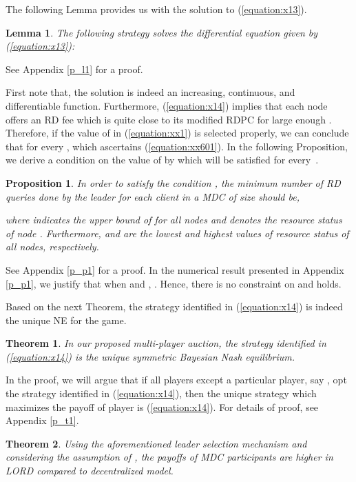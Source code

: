 \documentclass[journal,12pt, onecolumn]{IEEEtran}
\newtheorem{pr}{Proposition}
\newtheorem{lemma}{Lemma}
\newtheorem{thm}{Theorem}
\begin{document}
The following Lemma provides us with the solution to (\ref{equation:x13}).
\begin{lemma}\label{lemma:diff}
The following strategy solves the differential equation given by (\ref{equation:x13}):
\vspace{-2mm}
 
 
\end{lemma}
See Appendix \ref{p_l1} for a proof.

First note that, the solution  is indeed an increasing, continuous, and differentiable function. Furthermore, (\ref{equation:x14}) implies that each node offers an RD fee which is quite close to its modified RDPC for large enough . Therefore, if the value of  in (\ref{equation:xx1}) is selected properly, we can conclude that for every ,  which ascertains (\ref{equation:xx601}). In the following Proposition, we derive a condition on the value of  by which  will be satisfied for every~.

\begin{pr}\label{peoposition:etha}
In order to satisfy the condition , the minimum number of RD queries done by the leader for each client in a MDC of size  should be,

where  indicates the upper bound of  for all nodes and  denotes the resource status of node . Furthermore,  and  are the lowest and highest values of resource status of all nodes, respectively.
\end{pr}
See Appendix \ref{p_p1} for a proof.
In the numerical result presented in Appendix \ref{p_p1}, we justify that when  and , .
Hence, there is no constraint on  and  holds. 


Based on the next Theorem, the strategy identified in (\ref{equation:x14}) is indeed the unique NE for the game. 

\begin{thm}\label{peoposition:sufficiency}
In our proposed multi-player auction, the strategy identified in (\ref{equation:x14}) is the unique symmetric Bayesian Nash equilibrium.
\end{thm}

In the proof, we will argue that if all players except a particular player, say , opt the strategy identified in (\ref{equation:x14}), then the unique strategy which maximizes the payoff of player  is (\ref{equation:x14}). For details of proof, see Appendix \ref{p_t1}.

\begin{thm}
Using the aforementioned leader selection mechanism and considering the assumption of , the payoffs of MDC participants are higher in LORD compared to decentralized model.
\end{thm}
\end{document}
